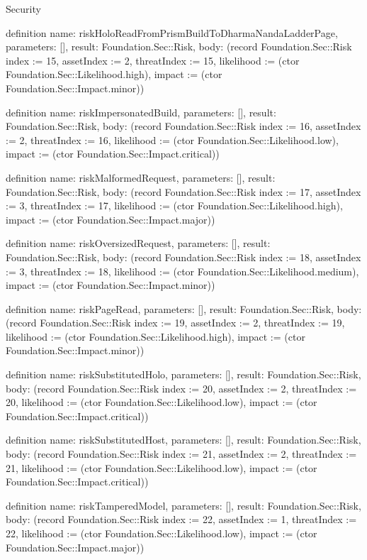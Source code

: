 \begin{lexlean}{Security}
\begin{semanticmodule}
definition{
  name: riskHoloReadFromPrismBuildToDharmaNandaLadderPage,
  parameters: [],
  result: Foundation.Sec::Risk,
  body: (record Foundation.Sec::Risk {index := 15, assetIndex := 2, threatIndex := 15, likelihood := (ctor Foundation.Sec::Likelihood.high), impact := (ctor Foundation.Sec::Impact.minor)})
}

definition{
  name: riskImpersonatedBuild,
  parameters: [],
  result: Foundation.Sec::Risk,
  body: (record Foundation.Sec::Risk {index := 16, assetIndex := 2, threatIndex := 16, likelihood := (ctor Foundation.Sec::Likelihood.low), impact := (ctor Foundation.Sec::Impact.critical)})
}

definition{
  name: riskMalformedRequest,
  parameters: [],
  result: Foundation.Sec::Risk,
  body: (record Foundation.Sec::Risk {index := 17, assetIndex := 3, threatIndex := 17, likelihood := (ctor Foundation.Sec::Likelihood.high), impact := (ctor Foundation.Sec::Impact.major)})
}

definition{
  name: riskOversizedRequest,
  parameters: [],
  result: Foundation.Sec::Risk,
  body: (record Foundation.Sec::Risk {index := 18, assetIndex := 3, threatIndex := 18, likelihood := (ctor Foundation.Sec::Likelihood.medium), impact := (ctor Foundation.Sec::Impact.minor)})
}

definition{
  name: riskPageRead,
  parameters: [],
  result: Foundation.Sec::Risk,
  body: (record Foundation.Sec::Risk {index := 19, assetIndex := 2, threatIndex := 19, likelihood := (ctor Foundation.Sec::Likelihood.high), impact := (ctor Foundation.Sec::Impact.minor)})
}

definition{
  name: riskSubstitutedHolo,
  parameters: [],
  result: Foundation.Sec::Risk,
  body: (record Foundation.Sec::Risk {index := 20, assetIndex := 2, threatIndex := 20, likelihood := (ctor Foundation.Sec::Likelihood.low), impact := (ctor Foundation.Sec::Impact.critical)})
}

definition{
  name: riskSubstitutedHost,
  parameters: [],
  result: Foundation.Sec::Risk,
  body: (record Foundation.Sec::Risk {index := 21, assetIndex := 2, threatIndex := 21, likelihood := (ctor Foundation.Sec::Likelihood.low), impact := (ctor Foundation.Sec::Impact.critical)})
}

definition{
  name: riskTamperedModel,
  parameters: [],
  result: Foundation.Sec::Risk,
  body: (record Foundation.Sec::Risk {index := 22, assetIndex := 1, threatIndex := 22, likelihood := (ctor Foundation.Sec::Likelihood.low), impact := (ctor Foundation.Sec::Impact.major)})
}


\end{semanticmodule}
\end{lexlean}
